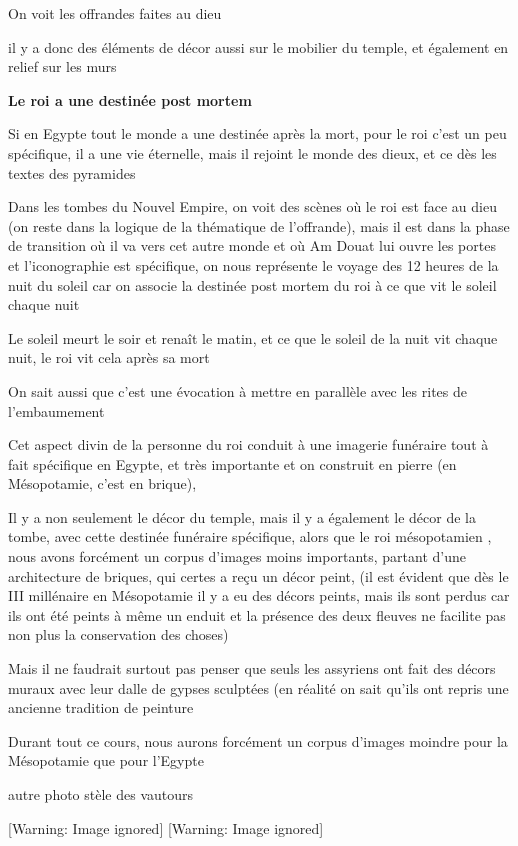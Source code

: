 \documentclass[a4paper,10pt]{article}
\begin{document}
\begin{itemize}
On voit les offrandes faites au dieu

il y a donc des éléments de décor aussi sur le mobilier du temple, et
également en relief sur les murs

\textbf{Le roi a une destinée post mortem}

Si en Egypte tout le monde a une destinée après la mort, pour le roi
c'est un peu spécifique, il a une vie éternelle, mais
il rejoint le monde des dieux, et ce dès les textes des pyramides

Dans les tombes du Nouvel Empire, on voit des scènes où le roi est face
au dieu (on reste dans la logique de la thématique de 
l'offrande), mais il est dans la phase de transition
où il va vers cet autre monde et où Am Douat lui ouvre les portes et
l'iconographie est spécifique, on nous représente le
voyage des 12 heures de la nuit du soleil car on associe la destinée
post mortem du roi à ce que vit le soleil chaque nuit

Le soleil meurt le soir et renaît le matin, et ce que le soleil de la
nuit vit chaque nuit, le roi vit cela après sa mort

On sait aussi que c'est une évocation à mettre en
parallèle avec les rites de l'embaumement

Cet aspect divin de la personne du roi conduit à une imagerie funéraire
tout à fait spécifique en Egypte, et très importante et on construit en
pierre (en Mésopotamie, c'est en brique), 

Il y a non seulement le décor du temple, mais il y a également le décor
de la tombe, avec cette destinée funéraire spécifique, alors que le roi
mésopotamien , nous avons forcément un corpus d'images
moins importants, partant d'une architecture de
briques, qui certes  a reçu un décor peint,  (il est évident que dès le
III millénaire en Mésopotamie il y a eu des décors peints, mais ils
sont perdus car ils ont été peints à même un enduit et la présence des
deux fleuves ne facilite pas non plus la conservation des choses)

Mais il ne faudrait surtout pas penser que seuls les assyriens ont fait
des décors muraux avec leur dalle de gypses sculptées (en réalité on
sait qu'ils ont repris une ancienne tradition de
peinture

Durant tout ce cours, nous aurons forcément un corpus
d'images moindre pour la Mésopotamie que pour
l'Egypte

autre photo stèle des vautours

  [Warning: Image ignored] %
   [Warning: Image ignored] %
 



\end{itemize}
\end{document}
